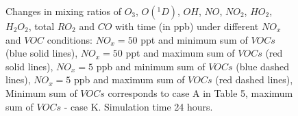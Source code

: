 \begin{figure}[h!]
\caption{Changes in mixing ratios of $O_3$, $O(^1D)$, $OH$, $NO$, $NO_2$, $HO_2$, $H_2O_2$, total $RO_2$ and $CO$ with time (in ppb) under different $NO_x$ and $VOC$ conditions: 
$NO_x=50$ ppt and minimum sum of $VOCs$ (blue solid lines), 
$NO_x=50$ ppt and maximum sum of $VOCs$ (red solid lines), 
$NO_x=5$ ppb and minimum sum of $VOCs$ (blue dashed lines),
$NO_x=5$ ppb and maximum sum of $VOCs$ (red dashed lines), Minimum sum of $VOCs$ corresponds to case A in Table 5, maximum sum of $VOCs$ - case K. Simulation time 24 hours.}
\label{fig:res0}
\end{figure}
